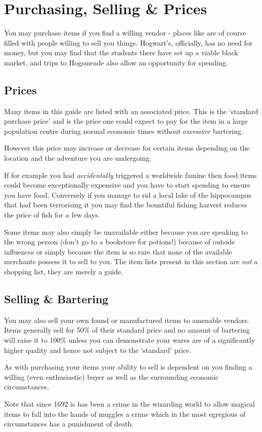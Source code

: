 \section{Purchasing, Selling \& Prices}


You may purchase items if you find a willing vendor - places like  are of course filled with people willing to sell you things. Hogwart's, officially, has no need for money, but you may find that the students there have set up a viable black market, and trips to Hogsmeade also allow an opportunity for spending. 


\subsection{Prices}

Many items in this guide are listed with an associated price. This is the `standard purchase price'\comma{} and is the price one could expect to pay for the item in a large population centre\comma{} during normal economic times\comma{} without excessive bartering. 

However\comma{} this price may increase or decrease for certain items\comma{} depending on the location and the adventure you are undergoing. 

If\comma{} for example\comma{} you had {\it accidentally} triggered a worldwide famine\comma{} then food items could become exceptionally expensive and you have to start spending  to ensure you have food. Conversely\comma{} if you manage to rid a local lake of the hippocampus that had been terrorising it\comma{} you may find the bountiful fishing harvest reduces the price of fish for a few days. 

Some items may also simply be unavailable \minus{} either because you are speaking to the wrong person (don't go to a bookstore for potions!)\comma{} because of outside influences\comma{} or simply because the item is so rare that none of the available merchants possess it to sell to you. The item lists present in this section are {\it not} a shopping list, they are merely a guide. 

\subsection{Selling \& Bartering}

You may also sell your own found or manufactured items to amenable vendors. Items generally sell for 50\% of their standard price\comma{} and no amount of bartering will raise it to 100\%\comma{} unless you can demonstrate your wares are of a significantly higher quality\comma{} and hence not subject to the `standard' price. 

As with purchasing your items\comma{} your ability to sell is dependent on you finding a willing (even enthusiastic) buyer\comma{} as well as the surrounding economic circumstances. 

Note that since 1692 is has been a crime in the wizarding world to allow magical items to fall into the hands of muggles \minus{} a crime which\comma{} in the most egregious of circumstances\comma{} has a punishment of death. 


